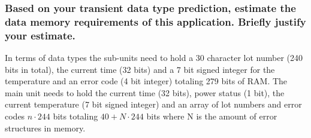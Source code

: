 \documentclass[12pt]{article} \usepackage{jeep} \usepackage{unicode}
\begin{document}
\subsubsection{Based on your transient data type prediction, estimate the data memory requirements of this application. Briefly justify your estimate.}
In terms of data types the sub-units need to hold a 30 character lot number (240
bits in total), the current time (32 bits) and a 7 bit signed integer for the
temperature and an error code (4 bit integer) totaling 279 bits of RAM. The main unit needs to hold the
current time (32 bits), power status (1 bit), the current temperature (7 bit signed integer) and an array of lot numbers and
error codes $n\cdot244$ bits totaling $40 + N\cdot244$ bits where N is the amount of error structures in memory. \vspace{\baselineskip}\\
\end{document}
